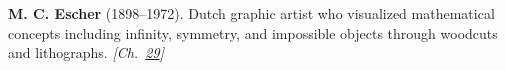 \textbf{M. C. Escher} (1898–1972). Dutch graphic artist who visualized mathematical concepts including infinity, symmetry, and impossible objects through woodcuts and lithographs. \emph{[Ch.~\hyperref[ch:hatmonotile]{29}]}

